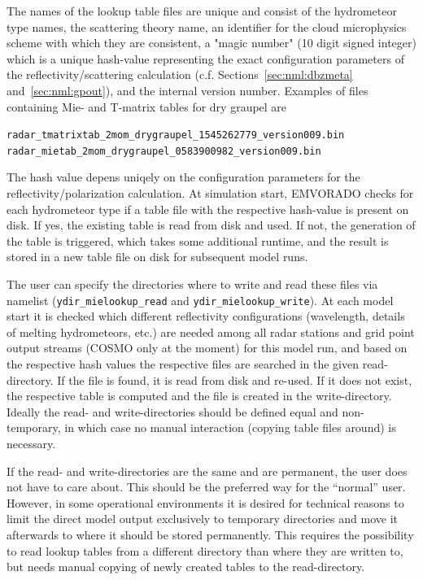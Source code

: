 \documentclass[10pt,a4paper,twoside,headinclude,footinclude,parskip=half]{scrartcl}
\newcommand{\srcform}[1]{\mbox{\texttt{#1}}\xspace}%
\begin{document}
The names of the lookup table files are unique and consist of the hydrometeor type names, the scattering theory name, an identifier for the cloud microphysics scheme with which they are consistent,
a "magic number" (10 digit signed integer) which is a unique hash-value representing the exact configuration parameters
of the reflectivity/scattering calculation (c.f. Sections~\ref{sec:nml:dbzmeta} and~\ref{sec:nml:gpout}), and the internal version number. Examples of files containing Mie- and T-matrix tables for dry graupel are
\begin{center}
  \verb|radar_tmatrixtab_2mom_drygraupel_1545262779_version009.bin|\\[0.3em]
  \verb|radar_mietab_2mom_drygraupel_0583900982_version009.bin|
\end{center}
The hash value depens uniqely on  the configuration parameters for the reflectivity/polarization calculation.
At simulation start, EMVORADO checks for each hydrometeor type if a table file with the respective hash-value is present on disk. If yes, the existing table is read from disk and used.
If not, the generation of the table is triggered, which takes some additional runtime, and the result is stored in a new table file on disk for subsequent model runs.

The user can specify the directories where to write and read these files via namelist (\srcform{ydir_mielookup_read} and \srcform{ydir_mielookup_write}).
At each model start it is checked which different reflectivity configurations (wavelength, details of melting hydrometeors,
etc.) are needed among all radar stations and grid point output streams (COSMO only at the moment) for this model run, and based on
the respective hash values the respective files are searched in the given read-directory. If the file is found,
it is read from disk and re-used. If it does not exist, the respective table is computed and the
file is created in the write-directory. Ideally the read- and write-directories should be defined equal and non-temporary,
in which case no manual interaction (copying table files around) is necessary.

If the read- and write-directories are the same and are permanent, the user does not have to care about. This
should be the preferred way for the ``normal'' user. However, in some operational environments it is
desired for technical reasons to limit the direct model output exclusively to temporary directories and move it afterwards
to where it should be stored permanently. This requires the possibility to read lookup tables
from a different directory than where they are written to, but needs manual copying of newly created tables to
the read-directory.
\end{document}
